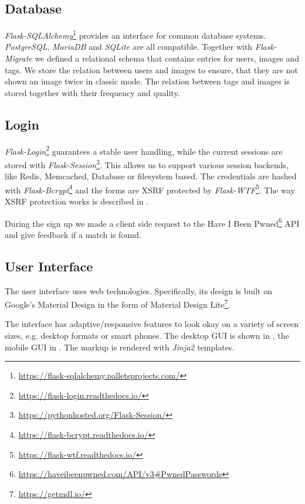 \subsection{Database}
\label{gacomphs19:sec:implementation:database}
\textit{Flask-SQLAlchemy}\footnote{\url{https://flask-sqlalchemy.palletsprojects.com/}} provides an interface for common database systems. \textit{PostgreSQL}, \textit{MariaDB} and \textit{SQLite} are all compatible.
Together with \textit{Flask-Migrate} we defined a relational schema that contains entries for users, images and tags. We store the relation between users and images to ensure, that they are not shown an image twice in classic mode. The relation between tags and images is stored together with their frequency and quality.

\subsection{Login}
\label{gacomphs19:sec:implementation:login}
\textit{Flask-Login}\footnote{\url{https://flask-login.readthedocs.io/}} guarantees a stable user handling, while the current sessions are stored with \textit{Flask-Session}\footnote{\url{https://pythonhosted.org/Flask-Session/}}. This allows us to support various session backends, like Redis, Memcached, Database or filesystem based. The credentials are hashed with \textit{Flask-Bcrypt}\footnote{\url{https://flask-bcrypt.readthedocs.io/}} and the forms are XSRF protected by \textit{Flask-WTF}\footnote{\url{https://flask-wtf.readthedocs.io/}}. The way XSRF protection works is described in \cite{4198791}.

During the sign up we made a client side request to the Have I Been Pwned\footnote{\url{https://haveibeenpwned.com/API/v3\#PwnedPasswords}} API and give feedback if a match is found.

\subsection{User Interface}
\label{gacomphs19:sec:implementation:UI}

The user interface uses web technologies. Specifically, its design is built on Google's Material Design in the form of Material Design Lite\footnote{\url{https://getmdl.io/}}.

The interface has adaptive/responsive features to look okay on a variety of screen sizes, e.g. desktop formats or smart phones. The desktop GUI is shown in , the mobile GUI in .
The markup is rendered with \textit{Jinja2} templates.



